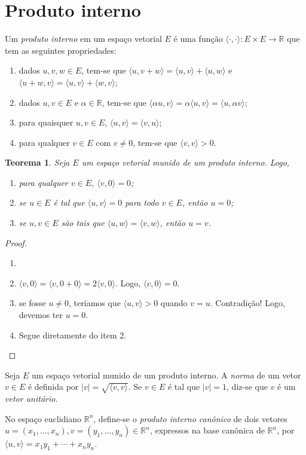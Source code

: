 \documentclass[12pt,a4paper]{article}
\newcommand{\ang}[1]{\langle#1\rangle}
\newcommand{\R}{\mathbb{R}}
\newtheorem{thm}{Teorema}[section]
\theoremstyle{definition}
\begin{document}
\section{Produto interno}

Um \textit{produto interno} em um espaço vetorial $E$ é uma função
$\ang{\cdot,\cdot}:E\times E\to\R$ que tem as seguintes propriedades:
\begin{enumerate}
\item dados $u,v,w\in E$, tem-se que $\ang{u,v+w}=\ang{u,v}+\ang{u,w}$
  e $\ang{u+w,v}=\ang{u,v}+\ang{w,v}$;
\item dados $u,v\in E$ e $\alpha\in\R$, tem-se que
  $\ang{\alpha u,v}=\alpha\ang{u,v}=\ang{u,\alpha v}$;
\item para quaisquer $u,v\in E$, $\ang{u,v}=\ang{v,u}$;
\item para qualquer $v\in E$ com $v\ne 0$, tem-se que $\ang{v,v}>0$.
\end{enumerate}

\begin{thm}
  Seja $E$ um espaço vetorial munido de um produto interno. Logo,
  \begin{enumerate}
  \item para qualquer $v\in E$, $\ang{v,0}=0$;
  \item se $u\in E$ é tal que $\ang{u,v}=0$ para todo $v\in E$, então
    $u=0$;
  \item se $u,v\in E$ são tais que $\ang{u,w}=\ang{v,w}$, então $u=v$.
  \end{enumerate}
\end{thm}
\begin{proof}
  \begin{enumerate}
  \item[]
  \item $\ang{v,0}=\ang{v,0+0}=2\ang{v,0}$. Logo, $\ang{v,0}=0$.
  \item se fosse $u\ne 0$, teríamos que $\ang{u,v}>0$ quando
    $v=u$. Contradição! Logo, devemos ter $u=0$.
  \item Segue diretamente do item 2.\qedhere
  \end{enumerate}
\end{proof}

Seja $E$ um espaço vetorial munido de um produto interno. A
\textit{norma} de um vetor $v\in E$ é definida por
$|v|=\sqrt{\ang{v,v}}$. Se $v\in E$ é tal que $|v|=1$, diz-se que $v$
é um \textit{vetor unitário}.

No espaço euclidiano $\R^n$, define-se o \textit{produto interno
  canônico} de dois vetores
$u=(x_1,\ldots,x_n),v=(y_1,\ldots,y_n)\in\R^n$, expressos na base
canônica de $\R^n$, por $\ang{u,v}=x_1y_1+\cdots+x_ny_n$.
\end{document}

